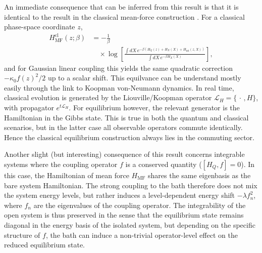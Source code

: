 \documentclass[aps,prl,twocolumn,superscriptaddress,showpacs,floatfix]{revtex4-2}
\begin{document}
An immediate consequence that can be inferred from this result is that it is identical to the result in the classical mean-force construction
\cite{campisiTalknerHanggi2009Solvable,talknerColloquiumStatisticalMechanics2020,cerisolaQuantumClassicalCorrespondence2024}.
For a classical phase-space coordinate $z$,
\begin{equation}
\begin{split}
    H_{\mathrm{MF}}^{\mathrm{cl}}(z;\beta)
    &=
    -\frac{1}{\beta} \\
    &\quad \times \log\!\left[
    \frac{\int dX\,e^{-\beta\left(H_Q(z)+H_X(X)+H_{\mathrm{int}}(z,X)\right)}}
    {\int dX\,e^{-\beta H_X(X)}}
    \right],
\end{split}
    \label{eq:hmf_classical_def_sec3}
\end{equation}
and for Gaussian linear coupling this yields the same quadratic correction $-\kappa_0 f(z)^2/2$ up to a scalar shift. This equilvance can be understand mostly easily through the link to Koopman von-Neumann dynamics. In real time, classical evolution is generated by the Liouville/Koopman operator $\mathcal L_H=\{\,\cdot\,,H\}$, with propagator $e^{t\mathcal L_H}$.
For equilibrium however, the relevant generator is the Hamiltonian in the Gibbs state. This is true in both the quantum and classical scenarios, but in the latter case all observable operators commute identically. Hence the classical equilibrium construction always lies in the commuting sector.

Another slight (but interesting) consequence of this result concerns integrable systems where the coupling operator $f$ is a conserved quantity ($[H_Q, f]=0$). In this case, the Hamiltonian of mean force $H_{\mathrm{MF}}$ shares the same eigenbasis as the bare system Hamiltonian. The strong coupling to the bath therefore does not mix the system energy levels, but rather induces a level-dependent energy shift $-\lambda f_n^2$, where $f_n$ are the eigenvalues of the coupling operator. The integrability of the open system is thus preserved in the sense that the equilibrium state remains diagonal in the energy basis of the isolated system, but depending on the specific structure of $f$, the bath can induce a non-trivial operator-level effect on the reduced equilibrium state. 
\end{document}
